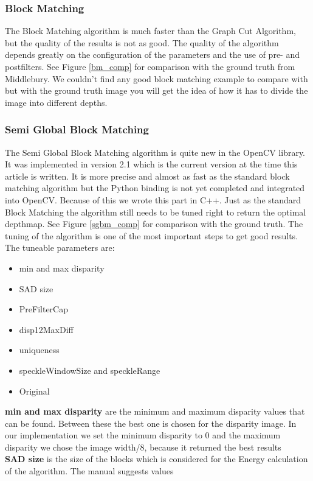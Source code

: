 \documentclass[a4paper]{article}
\begin{document}
\subsubsection{Block Matching} 
The Block Matching algorithm is much faster than the Graph Cut
Algorithm, but the quality of the results is not as good.  The quality
of the algorithm depends greatly on the configuration of the
parameters and the use of pre- and postfilters. See Figure
\ref{bm_comp} for comparison with the ground truth from Middlebury. We
couldn't find any good block matching example to compare with but with
the ground truth image you will get the idea of how it has to divide
the image into different depths.

\subsubsection{Semi Global Block Matching}
The Semi Global Block Matching algorithm is quite new in the OpenCV
library. It was implemented in version 2.1 which is the current
version at the time this article is written. It is more precise and
almost as fast as the standard block matching algorithm but the Python
binding is not yet completed and integrated into OpenCV. Because of
this we wrote this part in C++. Just as the standard Block Matching
the algorithm still needs to be tuned right to return the optimal
depthmap. See Figure \ref{sgbm_comp} for comparison with the ground
truth. The tuning of the algorithm is one of the most important
steps to get good results. The tuneable parameters are: 
\begin{itemize}
\item min and max disparity
\item SAD size
\item PreFilterCap
\item disp12MaxDiff
\item uniqueness
\item speckleWindowSize and speckleRange
\item Original
\end{itemize}
\noindent\textbf{min and max disparity} are the minimum and maximum disparity
values that can be found. Between these the best one is chosen for the
disparity image. In our implementation we set the minimum disparity to
0 and the maximum disparity we chose the image width/8, because it
returned the best results\\
\textbf{SAD size} is the size of the blocks which is considered for the
Energy calculation of the algorithm. The manual suggests values
\end{document}
